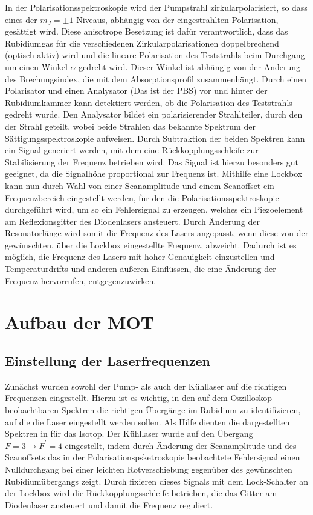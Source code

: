 \documentclass[11pt, a4paper]{article}
\numberwithin{equation}{section}
\newcommand{\korr}[1]{{\color{red}(#1)}}
\begin{document}
In der Polarisationsspektroskopie wird der Pumpstrahl zirkularpolarisiert, so dass eines der $m_J=\pm1$ Niveaus, abhängig von der eingestrahlten Polarisation, gesättigt wird.
Diese anisotrope Besetzung ist dafür verantwortlich, dass das Rubidiumgas für die verschiedenen Zirkularpolarisationen doppelbrechend (optisch aktiv) wird und die lineare Polarisation des Teststrahls beim Durchgang um einen Winkel $\alpha$ gedreht wird.
Dieser Winkel ist abhängig von der Änderung des Brechungsindex, die mit dem Absorptionsprofil zusammenhängt.
Durch einen Polarisator und einen Analysator \korr{Das ist der PBS} vor und hinter der Rubidiumkammer kann detektiert werden, ob die Polarisation des Teststrahls gedreht wurde.
Den Analysator bildet ein polarisierender Strahlteiler, durch den der Strahl geteilt, wobei beide Strahlen das bekannte Spektrum der Sättigungsspektroskopie aufweisen.
Durch Subtraktion der beiden Spektren kann ein Signal generiert werden, mit dem eine Rückkopplungsschleife zur Stabilisierung der Frequenz betrieben wird.
Das Signal ist hierzu besonders gut geeignet, da die Signalhöhe proportional zur Frequenz ist.
Mithilfe eine Lockbox kann nun durch Wahl von einer Scanamplitude und einem Scanoffset ein Frequenzbereich eingestellt werden, für den die Polarisationsspektroskopie durchgeführt wird, um so ein Fehlersignal zu erzeugen, welches ein Piezoelement am Reflexionsgitter des Diodenlasers ansteuert.
Durch Änderung der Resonatorlänge wird somit die Frequenz des Lasers angepasst, wenn diese von der gewünschten, über die Lockbox eingestellte Frequenz, abweicht.
Dadurch ist es möglich, die Frequenz des Lasers mit hoher Genauigkeit einzustellen und Temperaturdrifts und anderen äußeren Einflüssen, die eine Änderung der Frequenz hervorrufen, entgegenzuwirken.

\section{Aufbau der MOT}

\subsection{Einstellung der Laserfrequenzen}

Zunächst wurden sowohl der Pump- als auch der Kühllaser auf die richtigen Frequenzen eingestellt.
Hierzu ist es wichtig, in den auf dem Oszilloskop beobachtbaren Spektren die richtigen Übergänge im Rubidium zu identifizieren, auf die die Laser eingestellt werden sollen.
Als Hilfe dienten die dargestellten Spektren in \cite{anleitung} für das  Isotop.
Der Kühllaser wurde auf den Übergang $F=3 \rightarrow F^\prime=4$ eingestellt, indem durch Änderung der Scanamplitude und des Scanoffsets das in der Polarisationspsketroskopie beobachtete Fehlersignal einen Nulldurchgang bei einer leichten Rotverschiebung gegenüber des gewünschten Rubidiumübergangs zeigt.
Durch fixieren dieses Signals mit dem Lock-Schalter an der Lockbox wird die Rückkopplungsschleife betrieben, die das Gitter am Diodenlaser ansteuert und damit die Frequenz reguliert.
\end{document}
